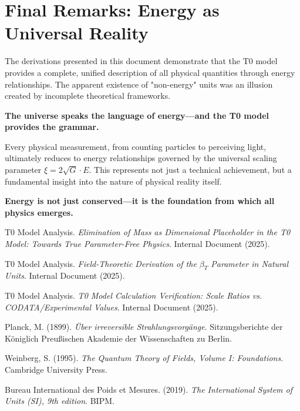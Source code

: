 \documentclass[12pt,a4paper]{article}
\newcommand{\xipar}{\xi}
\begin{document}
	\section{Final Remarks: Energy as Universal Reality}
	\label{sec:final_remarks}
	
	The derivations presented in this document demonstrate that the T0 model provides a complete, unified description of all physical quantities through energy relationships. The apparent existence of "non-energy" units was an illusion created by incomplete theoretical frameworks.
	
	\textbf{The universe speaks the language of energy—and the T0 model provides the grammar.}
	
	Every physical measurement, from counting particles to perceiving light, ultimately reduces to energy relationships governed by the universal scaling parameter $\xipar = 2\sqrt{G} \cdot E$. This represents not just a technical achievement, but a fundamental insight into the nature of physical reality itself.
	
	\textbf{Energy is not just conserved—it is the foundation from which all physics emerges.}
	
	\begin{thebibliography}{9}
		T0 Model Analysis. \textit{Elimination of Mass as Dimensional Placeholder in the T0 Model: Towards True Parameter-Free Physics}. Internal Document (2025).
		
		T0 Model Analysis. \textit{Field-Theoretic Derivation of the $\beta_T$ Parameter in Natural Units}. Internal Document (2025).
		
		T0 Model Analysis. \textit{T0 Model Calculation Verification: Scale Ratios vs. CODATA/Experimental Values}. Internal Document (2025).
		
		Planck, M. (1899). \textit{Über irreversible Strahlungsvorgänge}. Sitzungsberichte der Königlich Preußischen Akademie der Wissenschaften zu Berlin.
		
		Weinberg, S. (1995). \textit{The Quantum Theory of Fields, Volume I: Foundations}. Cambridge University Press.
		
		Bureau International des Poids et Mesures. (2019). \textit{The International System of Units (SI), 9th edition}. BIPM.
	\end{thebibliography}
	
\end{document}
